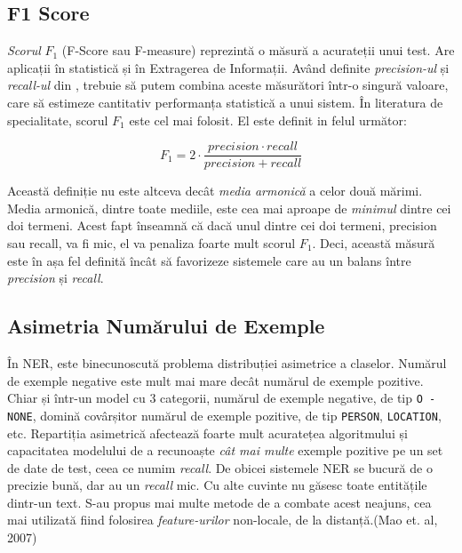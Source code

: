 \subsection{F1 Score}

\textit{Scorul} $F_1$ (F-Score sau F-measure) reprezintă o măsură a acurateții unui test. Are aplicații în statistică și în Extragerea de Informații. Având definite \textit{precision-ul} și \textit{recall-ul} din , trebuie să putem combina aceste măsurători într-o singură valoare, care să estimeze cantitativ performanța statistică a unui sistem. În literatura de specialitate, scorul $F_1$ este cel mai folosit. El este definit in felul următor:

\begin{equation}
F_{1} = 2 \cdot \frac{precision \cdot recall}{precision + recall}
\end{equation}

Această definiție nu este altceva decât \textit{media armonică} a celor două mărimi. Media armonică, dintre toate mediile, este cea mai aproape de \textit{minimul} dintre cei doi termeni. Acest fapt înseamnă că dacă unul dintre cei doi termeni, precision sau recall, va fi mic, el va penaliza foarte mult scorul $F_1$. Deci, această măsură este în așa fel definită încât să favorizeze sistemele care au un balans între \textit{precision} și \textit{recall}.

\subsection{Asimetria Numărului de Exemple}
\label{subsec:example-assymetry}

În NER, este binecunoscută problema distribuției asimetrice a claselor. Numărul de exemple negative este mult mai mare decât numărul de exemple pozitive. Chiar și într-un model cu 3 categorii, numărul de exemple negative, de tip \texttt{O - NONE}, domină covârșitor numărul de exemple pozitive, de tip \texttt{PERSON}, \texttt{LOCATION}, etc. Repartiția asimetrică afectează foarte mult acuratețea algoritmului și capacitatea modelului de a recunoaște \textit{cât mai multe} exemple pozitive pe un set de date de test, ceea ce numim \textit{recall}. De obicei sistemele NER se bucură de o precizie bună, dar au un \textit{recall} mic. Cu alte cuvinte nu găsesc toate entitățile dintr-un text. S-au propus mai multe metode de a combate acest neajuns, cea mai utilizată fiind folosirea \textit{feature-urilor} non-locale, de la distanță.(Mao et. al, 2007)\cite{Mao2007}


